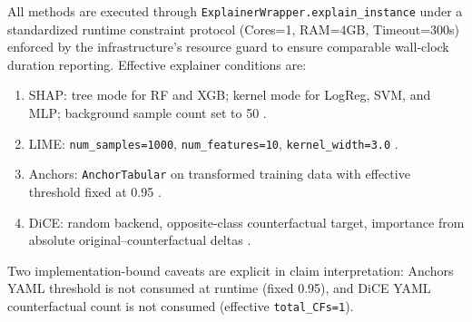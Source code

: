 \documentclass[twoside,11pt]{article}
\begin{document}
All methods are executed through \texttt{ExplainerWrapper.explain\_instance} under a standardized runtime constraint protocol (Cores=1, RAM=4GB, Timeout=300s) enforced by the infrastructure's resource guard to ensure comparable wall-clock duration reporting.
Effective explainer conditions are:
\begin{enumerate}[leftmargin=*]
    \item SHAP: tree mode for RF and XGB; kernel mode for LogReg, SVM, and MLP;
    background sample count set to 50 \citep{lundberg2017shap}.
    \item LIME: \texttt{num\_samples=1000}, \texttt{num\_features=10},
    \texttt{kernel\_width=3.0} \citep{ribeiro2016lime}.
    \item Anchors: \texttt{AnchorTabular} on transformed training data with
    effective threshold fixed at 0.95 \citep{ribeiro2018anchors}.
    \item DiCE: random backend, opposite-class counterfactual target, importance
    from absolute original--counterfactual deltas \citep{mothilal2020dice}.
\end{enumerate}

Two implementation-bound caveats are explicit in claim interpretation:
Anchors YAML threshold is not consumed at runtime (fixed 0.95), and DiCE YAML
counterfactual count is not consumed (effective \texttt{total\_CFs=1}).
\end{document}
